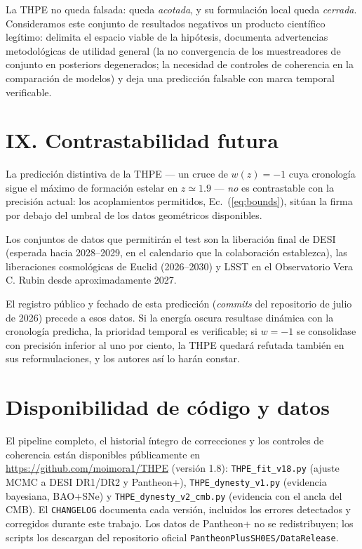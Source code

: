 \documentclass[aps,prd,twocolumn,superscriptaddress,nofootinbib,floatfix]{revtex4-2}
\begin{document}
La THPE no queda falsada: queda \emph{acotada}, y su formulaci\'on local
queda \emph{cerrada}. Consideramos este conjunto de resultados
negativos un producto cient\'ifico leg\'itimo: delimita el espacio
viable de la hip\'otesis, documenta advertencias metodol\'ogicas de
utilidad general (la no convergencia de los muestreadores de conjunto
en posteriors degenerados; la necesidad de controles de coherencia en
la comparaci\'on de modelos) y deja una predicci\'on falsable con
marca temporal verificable.

\section*{IX. Contrastabilidad futura}

La predicci\'on distintiva de la THPE --- un cruce de $w(z)=-1$ cuya
cronolog\'ia sigue el m\'aximo de formaci\'on estelar en $z\simeq1.9$
--- \emph{no} es contrastable con la precisi\'on actual: los
acoplamientos permitidos, Ec.~(\ref{eq:bounds}), sit\'uan la firma por
debajo del umbral de los datos geom\'etricos disponibles.

Los conjuntos de datos que permitir\'an el test son la liberaci\'on
final de DESI (esperada hacia 2028--2029, en el calendario que la
colaboraci\'on establezca), las liberaciones cosmol\'ogicas de Euclid
\cite{Euclid2011} (2026--2030) y LSST en el Observatorio Vera C. Rubin
\cite{LSST2019} desde aproximadamente 2027.

El registro p\'ublico y fechado de esta predicci\'on (\emph{commits} del
repositorio de julio de 2026) precede a esos datos. Si la energ\'ia
oscura resultase din\'amica con la cronolog\'ia predicha, la prioridad
temporal es verificable; si $w=-1$ se consolidase con precisi\'on
inferior al uno por ciento, la THPE quedar\'a refutada tambi\'en en sus
reformulaciones, y los autores as\'i lo har\'an constar.

\section*{Disponibilidad de c\'odigo y datos}

El pipeline completo, el historial \'integro de correcciones y los
controles de coherencia est\'an disponibles p\'ublicamente en
\url{https://github.com/moimora1/THPE} (versi\'on 1.8):
\texttt{THPE\_fit\_v18.py} (ajuste MCMC a DESI DR1/DR2 y Pantheon+),
\texttt{THPE\_dynesty\_v1.py} (evidencia bayesiana, BAO+SNe) y
\texttt{THPE\_dynesty\_v2\_cmb.py} (evidencia con el ancla del CMB). El
\texttt{CHANGELOG} documenta cada versi\'on, incluidos los errores
detectados y corregidos durante este trabajo. Los datos de Pantheon+ no
se redistribuyen; los scripts los descargan del repositorio oficial
\texttt{PantheonPlusSH0ES/DataRelease}.
\end{document}
